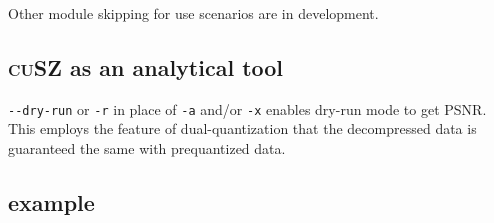 Other module skipping for use scenarios are in development.

\subsection{\texorpdfstring{\textsc{cuSZ} as an analytical
tool}{ as an analytical tool}}

\passthrough{\lstinline!--dry-run!} or \passthrough{\lstinline!-r!} in
place of \passthrough{\lstinline!-a!} and/or
\passthrough{\lstinline!-x!} enables dry-run mode to get PSNR. This
employs the feature of dual-quantization that the decompressed data is
guaranteed the same with prequantized data.

\subsection{example}

